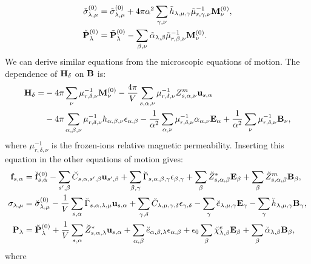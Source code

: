 \documentclass[12pt,a4paper]{article}
\begin{document}
{\begin{align}
\check \sigma^{(0)}_{\lambda,\mu} &= \tilde \sigma^{(0)}_{\lambda,\mu}
+ 4 \pi \alpha^2 \sum_{\gamma,\nu} \tilde h_{\lambda,\mu,\gamma} 
\tilde \mu^{-1}_{r,\gamma,\nu} {\bf M}^{(0)}_\nu,  \\
\check {\bf P}^{(0)}_{\lambda} &= \tilde {\bf P}^{(0)}_{\lambda}
- \sum_{\beta,\nu} \tilde \alpha_{\lambda,\beta} 
\tilde \mu^{-1}_{r,\beta,\nu} {\bf M}^{(0)}_\nu. 
\end{align}
We can derive similar equations from the microscopic equations of motion.
The dependence of ${\bf H}_\delta$ on ${\bf B}$ is:
\begin{align}
{\bf H}_\delta = 
&- 4 \pi \sum_\nu \mu^{-1}_{r,\delta,\nu} {\bf M}^{(0)}_\nu 
-{4 \pi \over V} \sum_{s,\alpha,\nu} \mu^{-1}_{r,\delta,\nu} Z^m_{s,\alpha,\nu}
{\bf u}_{s,\alpha} \nonumber\\
&- 4 \pi \sum_{\alpha,\beta,\nu} \mu^{-1}_{r,\delta,\nu} h_{\alpha,\beta,\nu}
\epsilon_{\alpha,\beta} - {1\over \alpha^2} \sum_{\alpha,\nu}
\mu^{-1}_{r,\delta,\nu} \alpha_{\alpha,\nu} {\bf E}_\alpha
+ {1\over \alpha^2} \sum_\nu \mu^{-1}_{r,\delta,\nu} {\bf B}_\nu, 
\end{align}
where $\mu^{-1}_{r,\delta,\nu}$ is the frozen-ions relative magnetic
permeability.
Inserting this equation in the other equations of motion gives:
\begin{align}
{\bf f}_{s,\alpha}&= \breve{\bf f}^{(0)}_{s,\alpha}
-\sum_{s',\beta} \breve C_{s,\alpha,s',\beta} {\bf u}_{s',\beta}
+\sum_{\beta,\gamma}
\breve \Gamma_{s,\alpha,\beta,\gamma} 
\epsilon_{\beta,\gamma} +
\sum_{\beta} \breve Z^*_{s,\alpha,\beta} {\bf E}_{\beta}
+\sum_{\beta} 
\breve Z^m_{s,\alpha,\beta} {\bf B}_{\beta}, \\
\sigma_{\lambda,\mu}&= \breve  \sigma_{\lambda,\mu}^{(0)}
-{1\over V} \sum_{s,\alpha}
\breve \Gamma_{s,\alpha,\lambda,\mu} {\bf u}_{s,\alpha}
+\sum_{\gamma,\delta} \breve C_{\lambda,\mu,\gamma,\delta}  
\epsilon_{\gamma,\delta} -
\sum_{\gamma} \breve e_{\lambda,\mu,\gamma} 
 {\bf E}_{\gamma}
-\sum_{\gamma}  \breve h_{\lambda,\mu,\gamma} 
{\bf B}_{\gamma}, \\
{\bf P}_{\lambda}&= \breve {\bf P}^{(0)}_{\lambda}
+{1\over V} \sum_{s,\alpha} \breve Z^*_{s,\alpha,\lambda} 
{\bf u}_{s,\alpha} +
\sum_{\alpha,\beta} \breve e_{\alpha,\beta,\lambda} 
\epsilon_{\alpha,\beta} +
\epsilon_0 \sum_{\beta} 
\breve \chi^e_{\lambda,\beta}
{\bf E}_{\beta} +
\sum_{\beta} \breve \alpha_{\lambda,\beta} 
{\bf B}_{\beta}, 
\end{align}
where
\begin{align}

\end{align}}
\end{document}

